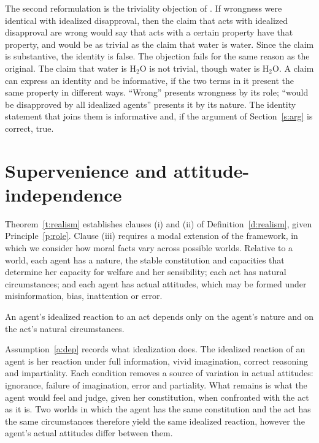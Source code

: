 \documentclass{situationist-preprint}
\begin{document}
The second reformulation is the triviality objection of \citet[vol.~2]{Parfit2011}. If wrongness were identical with idealized disapproval, then the claim that acts with idealized disapproval are wrong would say that acts with a certain property have that property, and would be as trivial as the claim that water is water. Since the claim is substantive, the identity is false. The objection fails for the same reason as the original. The claim that water is H$_2$O is not trivial, though water is H$_2$O. A claim can express an identity and be informative, if the two terms in it present the same property in different ways. \enquote{Wrong} presents wrongness by its role; \enquote{would be disapproved by all idealized agents} presents it by its nature. The identity statement that joins them is informative and, if the argument of Section~\ref{s:arg} is correct, true.

\section{Supervenience and attitude-independence}\label{s:sup}

Theorem~\ref{t:realism} establishes clauses (i) and (ii) of Definition~\ref{d:realism}, given Principle~\ref{p:role}. Clause (iii) requires a modal extension of the framework, in which we consider how moral facts vary across possible worlds. Relative to a world, each agent has a nature, the stable constitution and capacities that determine her capacity for welfare and her sensibility; each act has natural circumstances; and each agent has actual attitudes, which may be formed under misinformation, bias, inattention or error.

\begin{assumption}[Dependence]\label{a:dep}
An agent's idealized reaction to an act depends only on the agent's nature and on the act's natural circumstances.
\end{assumption}

Assumption~\ref{a:dep} records what idealization does. The idealized reaction of an agent is her reaction under full information, vivid imagination, correct reasoning and impartiality. Each condition removes a source of variation in actual attitudes: ignorance, failure of imagination, error and partiality. What remains is what the agent would feel and judge, given her constitution, when confronted with the act as it is. Two worlds in which the agent has the same constitution and the act has the same circumstances therefore yield the same idealized reaction, however the agent's actual attitudes differ between them.
\end{document}
